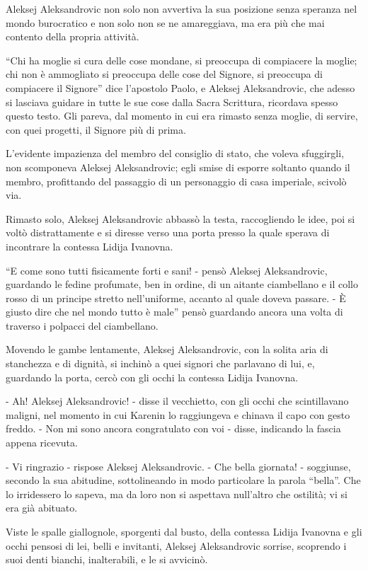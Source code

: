 Aleksej Aleksandrovic non solo non avvertiva la sua posizione senza speranza nel mondo burocratico e non solo non se ne amareggiava, ma era più che mai contento della propria attività. 

``Chi ha moglie si cura delle cose mondane, si preoccupa di compiacere la moglie; chi non è ammogliato si preoccupa delle cose del Signore, si preoccupa di compiacere il Signore'' dice l'apostolo Paolo, e Aleksej Aleksandrovic, che adesso si lasciava guidare in tutte le sue cose dalla Sacra Scrittura, ricordava spesso questo testo. Gli pareva, dal momento in cui era rimasto senza moglie, di servire, con quei progetti, il Signore più di prima. 

L'evidente impazienza del membro del consiglio di stato, che voleva sfuggirgli, non scomponeva Aleksej Aleksandrovic; egli smise di esporre soltanto quando il membro, profittando del passaggio di un personaggio di casa imperiale, scivolò via. 

Rimasto solo, Aleksej Aleksandrovic abbassò la testa, raccogliendo le idee, poi si voltò distrattamente e si diresse verso una porta presso la quale sperava di incontrare la contessa Lidija Ivanovna. 

``E come sono tutti fisicamente forti e sani! - pensò Aleksej Aleksandrovic, guardando le fedine profumate, ben in ordine, di un aitante ciambellano e il collo rosso di un principe stretto nell'uniforme, accanto al quale doveva passare. - È giusto dire che nel mondo tutto è male'' pensò guardando ancora una volta di traverso i polpacci del ciambellano. 

Movendo le gambe lentamente, Aleksej Aleksandrovic, con la solita aria di stanchezza e di dignità, si inchinò a quei signori che parlavano di lui, e, guardando la porta, cercò con gli occhi la contessa Lidija Ivanovna. 

- Ah! Aleksej Aleksandrovic! - disse il vecchietto, con gli occhi che scintillavano maligni, nel momento in cui Karenin lo raggiungeva e chinava il capo con gesto freddo. - Non mi sono ancora congratulato con voi - disse, indicando la fascia appena ricevuta. 

- Vi ringrazio - rispose Aleksej Aleksandrovic. - Che bella giornata! - soggiunse, secondo la sua abitudine, sottolineando in modo particolare la parola ``bella''. Che lo irridessero lo sapeva, ma da loro non si aspettava null'altro che ostilità; vi si era già abituato. 

Viste le spalle giallognole, sporgenti dal busto, della contessa Lidija Ivanovna e gli occhi pensosi di lei, belli e invitanti, Aleksej Aleksandrovic sorrise, scoprendo i suoi denti bianchi, inalterabili, e le si avvicinò. 

